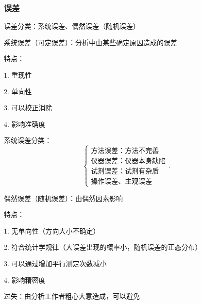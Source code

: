 \subsubsection{误差}%
\label{subsub:误差}
\begin{notation}
    误差分类：系统误差、偶然误差（随机误差）
\end{notation}
\begin{defi}
    系统误差（可定误差）：分析中由某些确定原因造成的误差

    特点：

    1. 重现性

    2. 单向性

    3. 可以校正消除

    4. 影响准确度
\end{defi}
\begin{notation}
    系统误差分类：
    \[
        \begin{cases}
            \mbox{方法误差：方法不完善}\\ 
            \mbox{仪器误差：仪器本身缺陷}\\ 
            \mbox{试剂误差：试剂有杂质}\\ 
            \mbox{操作误差、主观误差}
        \end{cases}
    .\] 
\end{notation}
\begin{defi}
    偶然误差（随机误差）：由偶然因素影响

    特点：

    1. 无单向性（方向大小不确定）

    2. 符合统计学规律（大误差出现的概率小，随机误差的正态分布）

    3. 可以通过增加平行测定次数减小

    4. 影响精密度
\end{defi}
\begin{defi}
    过失：由分析工作者粗心大意造成，可以避免
\end{defi}
